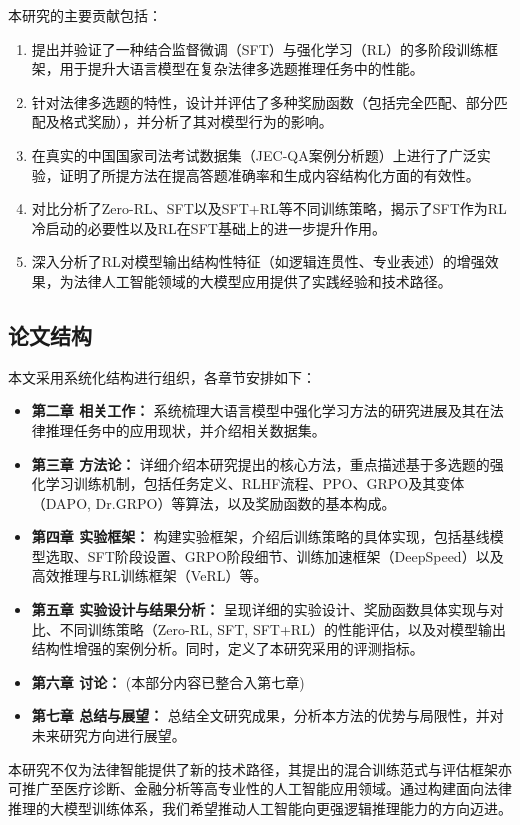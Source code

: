 \documentclass{article}
\begin{document}
本研究的主要贡献包括：
\begin{enumerate}
    \item 提出并验证了一种结合监督微调（SFT）与强化学习（RL）的多阶段训练框架，用于提升大语言模型在复杂法律多选题推理任务中的性能。
    \item 针对法律多选题的特性，设计并评估了多种奖励函数（包括完全匹配、部分匹配及格式奖励），并分析了其对模型行为的影响。
    \item 在真实的中国国家司法考试数据集（JEC-QA案例分析题）上进行了广泛实验，证明了所提方法在提高答题准确率和生成内容结构化方面的有效性。
    \item 对比分析了Zero-RL、SFT以及SFT+RL等不同训练策略，揭示了SFT作为RL冷启动的必要性以及RL在SFT基础上的进一步提升作用。
    \item 深入分析了RL对模型输出结构性特征（如逻辑连贯性、专业表述）的增强效果，为法律人工智能领域的大模型应用提供了实践经验和技术路径。
\end{enumerate}

\subsection{论文结构}

本文采用系统化结构进行组织，各章节安排如下：

\begin{itemize}
\item \textbf{第二章 相关工作：} 系统梳理大语言模型中强化学习方法的研究进展及其在法律推理任务中的应用现状，并介绍相关数据集。
\item \textbf{第三章 方法论：} 详细介绍本研究提出的核心方法，重点描述基于多选题的强化学习训练机制，包括任务定义、RLHF流程、PPO、GRPO及其变体（DAPO, Dr.GRPO）等算法，以及奖励函数的基本构成。
\item \textbf{第四章 实验框架：} 构建实验框架，介绍后训练策略的具体实现，包括基线模型选取、SFT阶段设置、GRPO阶段细节、训练加速框架（DeepSpeed）以及高效推理与RL训练框架（VeRL）等。
\item \textbf{第五章 实验设计与结果分析：} 呈现详细的实验设计、奖励函数具体实现与对比、不同训练策略（Zero-RL, SFT, SFT+RL）的性能评估，以及对模型输出结构性增强的案例分析。同时，定义了本研究采用的评测指标。
\item \textbf{第六章 讨论：} (本部分内容已整合入第七章)
\item \textbf{第七章 总结与展望：} 总结全文研究成果，分析本方法的优势与局限性，并对未来研究方向进行展望。
\end{itemize}

本研究不仅为法律智能提供了新的技术路径，其提出的混合训练范式与评估框架亦可推广至医疗诊断、金融分析等高专业性的人工智能应用领域。通过构建面向法律推理的大模型训练体系，我们希望推动人工智能向更强逻辑推理能力的方向迈进。
\end{document}
